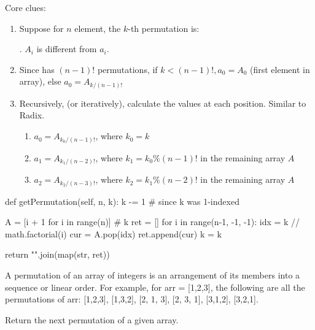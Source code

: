 Core clues:
\begin{enumerate}
\item {}

Suppose for $n$ element, the $k$-th permutation is:

. $A_i$ is different from $a_i$.
\item {} Since \pyinline{[a1, a3, ..., an-1]} has $(n-1)!$ permutations,
if $k < (n-1)!, a_0 = A_0$ (first element in array), else $a_0 = A_{k/(n-1)!}$

\item Recursively, (or iteratively), calculate the values at each position. Similar to Radix. 
\begin{enumerate}
\item $a_0 = A_{k_0/(n-1)!}$, where $k_0 = k$
\item $a_1 = A_{k_1/(n-2)!}$, where $k_1 = k_0\%(n-1)!$ in the remaining array $A$
\item $a_2 = A_{k_2/(n-3)!}$, where $k_2 = k_1\%(n-2)!$ in the remaining array $A$
\end{enumerate}
\end{enumerate}
\begin{python}
def getPermutation(self, n, k):
    k -= 1  # since k was 1-indexed

    A = [i + 1 for i in range(n)]
    # k %
    ret = []
    for i in range(n-1, -1, -1):
        idx = k // math.factorial(i) 
        cur = A.pop(idx)
        ret.append(cur)
        k = k %

    return "".join(map(str, ret))
\end{python}
 A permutation of an array of integers is an arrangement of its members into a sequence or linear order. For example, for arr = [1,2,3], the following are all the permutations of arr: [1,2,3], [1,3,2], [2, 1, 3], [2, 3, 1], [3,1,2], [3,2,1].

Return the next permutation of a given array.

